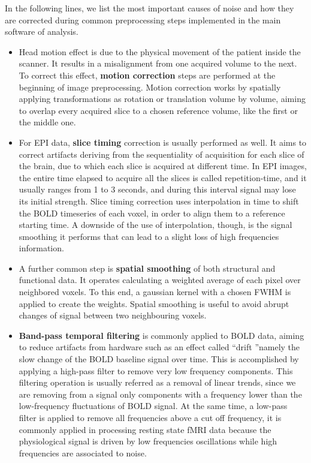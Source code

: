 \documentclass[11pt]{report}
\begin{document}
In the following lines, we list the most important causes of noise and how they are corrected during common preprocessing steps implemented in the main software of analysis.
\begin{itemize}
\item Head motion effect is due to the physical movement of the patient inside the scanner. It results in a misalignment from one acquired volume to the next.
To correct this effect, \textbf{motion correction} steps are performed at the beginning of image preprocessing. Motion correction works by spatially applying transformations as rotation or translation volume by volume, aiming to overlap every acquired slice to a chosen reference volume, like the first or the middle one.

\item For EPI data, \textbf{slice timing} correction is usually performed as well. It aims to correct artifacts deriving from the sequentiality of acquisition for each slice of the brain, due to which each slice is acquired at different time.
In EPI images, the entire time elapsed to acquire all the slices is called repetition-time, and it usually ranges from 1 to 3 seconds, and during this interval signal may lose its initial strength.
Slice timing correction uses interpolation in time to shift the BOLD timeseries of each voxel, in order to align them to a reference starting time.
A downside of the use of interpolation, though, is the signal smoothing it performs that can lead to a slight loss of high frequencies information.

\item A further common step is \textbf{spatial smoothing} of both structural and functional data. It operates calculating a weighted average of each pixel over neighbored voxels. To this end, a gaussian kernel with a chosen FWHM is applied to create the weights.
Spatial smoothing is useful to avoid abrupt changes of signal between two neighbouring voxels.

\item \textbf{Band-pass temporal filtering} is commonly applied to BOLD data, aiming to reduce artifacts from hardware such as an effect called \textquotedblleft drift \textquotedblright namely the slow change of the BOLD baseline signal over time. This is accomplished by applying a high-pass filter to remove very low frequency components. This filtering operation is usually referred as a removal of linear trends, since we are removing from a signal only components with a frequency lower than the low-frequency fluctuations of BOLD signal.
At the same time, a low-pass filter is applied to remove all frequencies above a cut off frequency, it is commonly applied in processing resting state fMRI data because the physiological signal is driven by low frequencies oscillations while high frequencies are associated to noise.

\end{itemize}
\end{document}
